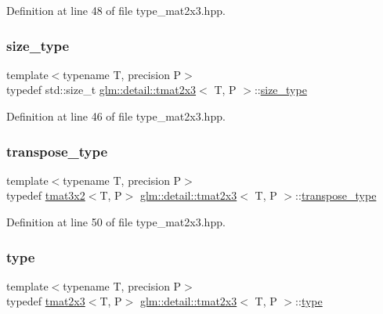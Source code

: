 Definition at line 48 of file type\+\_\+mat2x3.\+hpp.

\mbox{\label{structglm_1_1detail_1_1tmat2x3_ab27aa4557eb2ffaf9931bcee48823cde}} 
\subsubsection{\texorpdfstring{size\+\_\+type}{size\_type}}
{\footnotesize\ttfamily template$<$typename T, precision P$>$ \\
typedef std\+::size\+\_\+t \hyperlink{structglm_1_1detail_1_1tmat2x3}{glm\+::detail\+::tmat2x3}$<$ T, P $>$\+::\hyperlink{structglm_1_1detail_1_1tmat2x3_ab27aa4557eb2ffaf9931bcee48823cde}{size\+\_\+type}}



Definition at line 46 of file type\+\_\+mat2x3.\+hpp.

\mbox{\label{structglm_1_1detail_1_1tmat2x3_aba2a62afb75e30c53886be45955591ae}} 
\subsubsection{\texorpdfstring{transpose\+\_\+type}{transpose\_type}}
{\footnotesize\ttfamily template$<$typename T, precision P$>$ \\
typedef \hyperlink{structglm_1_1detail_1_1tmat3x2}{tmat3x2}$<$T, P$>$ \hyperlink{structglm_1_1detail_1_1tmat2x3}{glm\+::detail\+::tmat2x3}$<$ T, P $>$\+::\hyperlink{structglm_1_1detail_1_1tmat2x3_aba2a62afb75e30c53886be45955591ae}{transpose\+\_\+type}}



Definition at line 50 of file type\+\_\+mat2x3.\+hpp.

\mbox{\label{structglm_1_1detail_1_1tmat2x3_ac22545a54f77e4e0915042109672179f}} 
\subsubsection{\texorpdfstring{type}{type}}
{\footnotesize\ttfamily template$<$typename T, precision P$>$ \\
typedef \hyperlink{structglm_1_1detail_1_1tmat2x3}{tmat2x3}$<$T, P$>$ \hyperlink{structglm_1_1detail_1_1tmat2x3}{glm\+::detail\+::tmat2x3}$<$ T, P $>$\+::\hyperlink{structglm_1_1detail_1_1tmat2x3_ac22545a54f77e4e0915042109672179f}{type}}



